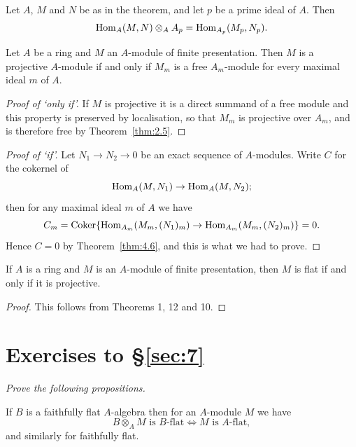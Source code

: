 \begin{corollary*}
Let $A$, $M$ and $N$ be as in the theorem, and let $p$ be a prime ideal of
$A$. Then
\[
  \operatorname{Hom}_A(M, N) \otimes_A A_p = \operatorname{Hom}_{A_p}(M_p, N_p).
\]
\end{corollary*}

\begin{theorem}\label{thm:7.12}
Let $A$ be a ring and $M$ an $A$-module of finite presentation.
Then $M$ is a projective $A$-module if and only if $M_m$ is a free $A_m$-module for
every maximal ideal $m$ of $A$.
\end{theorem}

\begin{proof}[Proof of `only if']
If $M$ is projective it is a direct summand of a free module
and this property is preserved by localisation, so that $M_m$ is projective over
$A_m$, and is therefore free by Theorem~\ref{thm:2.5}.
\end{proof}

\begin{proof}[Proof of `if']
Let $N_1 \to N_2 \to 0$ be an exact sequence of $A$-modules.
Write $C$ for the cokernel of
\[
  \operatorname{Hom}_A(M, N_1) \to \operatorname{Hom}_A(M, N_2);
\]
then for any maximal ideal $m$ of $A$ we have
\[
  C_m = \operatorname{Coker}\{\operatorname{Hom}_{A_m}(M_m, (N_1)_m) \to \operatorname{Hom}_{A_m}(M_m, (N_2)_m)\} = 0.
\]
Hence $C = 0$ by Theorem~\ref{thm:4.6}, and this is what we had to prove.
\end{proof}

\begin{corollary*}
If $A$ is a ring and $M$ is an $A$-module of finite presentation, then
$M$ is flat if and only if it is projective.
\end{corollary*}

\begin{proof}
This follows from Theorems 1, 12 and 10.
\end{proof}

\section*{Exercises to \S\ref{sec:7}}
\emph{Prove the following propositions.}

\begin{exercise}\label{ex:7.1-ex}
If $B$ is a faithfully flat $A$-algebra then for an $A$-module $M$ we have
\[
  B \otimes_A M \text{ is $B$-flat} \iff M \text{ is $A$-flat},
\]
and similarly for faithfully flat.
\end{exercise}

